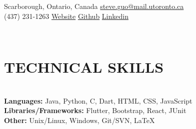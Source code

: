 \documentclass[12pt,letterpaper,roman]{moderncv}
\def \scaleFont {1.17} %
\def \spaceTop {12.5mm}
\def \headingSpace {-11mm}
\def \skillSpacing {1mm}
\def \sectionSpacing {-10mm}
\begin{document}
\newpage
{} %
\relscale{\scaleFont} %
\makecvtitle
\vspace*{-27mm}

\begin{center} 
	\faMapO\enspace Scarborough, Ontario, Canada  \qquad \faEnvelopeO\enspace \href{mailto:steve.guo@mail.utoronto.ca}{steve.guo@mail.utoronto.ca} \\
	\faMobile\enspace (437) 231-1263  \hspace*{\spaceTop}  \href{https://epicsteve2.github.io/}{\faGlobe\enspace Website}   \hspace*{\spaceTop}  \href{https://github.com/Epicsteve2}{\faGithub\enspace Github}   \hspace*{\spaceTop}  \href{https://www.linkedin.com/in/stephen-guo-399959192/}{\faLinkedin\enspace Linkedin}\\
\end{center} \leavevmode\\[-24mm]

\section{TECHNICAL SKILLS} \leavevmode \\[\headingSpace] 
\textbf{Languages:} Java,\hspace*{\skillSpacing} Python,\hspace*{\skillSpacing} C,\hspace*{\skillSpacing} Dart,\hspace*{\skillSpacing} HTML,\hspace*{\skillSpacing} CSS,\hspace*{\skillSpacing} JavaScript \\
\textbf{Libraries/Frameworks:} Flutter,\hspace*{\skillSpacing} Bootstrap,\hspace*{\skillSpacing} React,\hspace*{\skillSpacing } JUnit \\
\textbf{Other:} Unix/Linux,\hspace*{\skillSpacing} Windows,\hspace*{\skillSpacing} Git/SVN,\hspace*{\skillSpacing} LaTeX
\\[\sectionSpacing]
\end{document}
